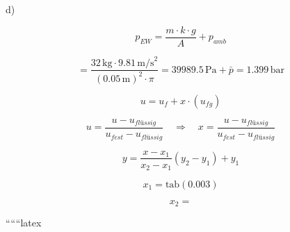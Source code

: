 d)

\[
p_{EW} = \frac{m \cdot k \cdot g}{A} + p_{amb}
\]

\[
= \frac{32 \, \text{kg} \cdot 9.81 \, \text{m/s}^2}{(0.05 \, \text{m})^2 \cdot \pi} = 39989.5 \, \text{Pa} + \bar{p} = 1.399 \, \text{bar}
\]

\[
u = u_f + x \cdot (u_{fg})
\]

\[
u = \frac{u - u_{flüssig}}{u_{fest} - u_{flüssig}} \quad \Rightarrow \quad x = \frac{u - u_{flüssig}}{u_{fest} - u_{flüssig}}
\]


\[
y = \frac{x - x_1}{x_2 - x_1} (y_2 - y_1) + y_1
\]

\[
x_1 = \text{tab}(0.003)
\]

\[
x_2 = 
\]

``````latex